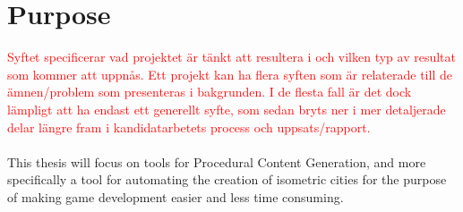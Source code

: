 \section{Purpose}
\textcolor{red}{
Syftet specificerar vad projektet är tänkt att resultera i och vilken typ av resultat som kommer att uppnås. Ett projekt kan ha flera syften som är relaterade till de ämnen/problem som presenteras i bakgrunden. I de flesta fall är det dock lämpligt att ha endast ett generellt syfte, som sedan bryts ner i mer detaljerade delar längre fram i kandidatarbetets process och uppsats/rapport.
}
\\\\
This thesis will focus on tools for Procedural Content Generation, and more specifically a tool for automating the creation of isometric cities for the purpose of making game development easier and less time consuming.
